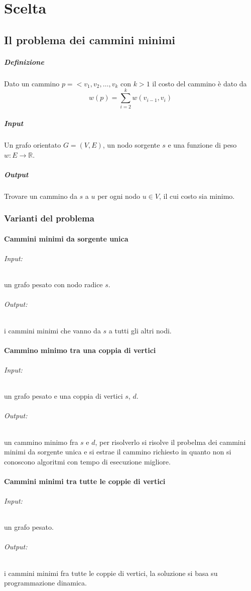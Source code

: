 \chapter{Scelta}
\section{Il problema dei cammini minimi}
\paragraph{Definizione}
Dato un cammino $p=<v_1, v_2, \dots, v_k$ con $k>1$ il costo del cammino \`e dato da $$w(p) = \sum\limits_{i =2}^k w(v_{i-1}, v_i)$$
\paragraph{Input}
Un grafo orientato $G = (V, E)$, un nodo sorgente $s$ e una funzione di peso $w: E\rightarrow \mathbb{R}$.
\paragraph{Output}
Trovare un cammino da $s$ a $u$ per ogni nodo $u\in V$, il cui costo sia minimo.
\subsection{Varianti del problema}
\subsubsection{Cammini minimi da sorgente unica}
\subparagraph{Input:} un grafo pesato con nodo radice $s$.
\subparagraph{Output:} i cammini minimi che vanno da $s$ a tutti gli altri nodi.
\subsubsection{Cammino minimo tra una coppia di vertici}
\subparagraph{Input:} un grafo pesato e una coppia di vertici $s$, $d$.
\subparagraph{Output:} un cammino minimo fra $s$ e $d$, per risolverlo si risolve il probelma dei cammini minimi da sorgente unica e si estrae il cammino richiesto in quanto non si 
conoscono algoritmi con tempo di esecuzione migliore.
\subsubsection{Cammini minimi tra tutte le coppie di vertici}
\subparagraph{Input:} un grafo pesato.
\subparagraph{Output:} i cammini minimi fra tutte le coppie di vertici, la soluzione si basa su programmazione dinamica.
